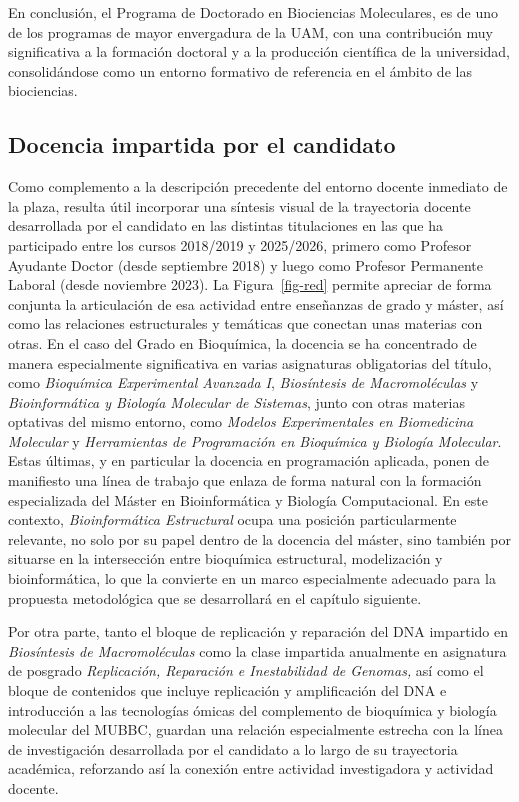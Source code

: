 \documentclass[
  11pt,
  a4paper,
  twoside]{scrreprt}
\begin{document}
En conclusión, el Programa de Doctorado en Biociencias Moleculares, es
de uno de los programas de mayor envergadura de la UAM, con una
contribución muy significativa a la formación doctoral y a la producción
científica de la universidad, consolidándose como un entorno formativo
de referencia en el ámbito de las biociencias.

\subsection{Docencia impartida por el candidato}\label{sec-yo}

Como complemento a la descripción precedente del entorno docente
inmediato de la plaza, resulta útil incorporar una síntesis visual de la
trayectoria docente desarrollada por el candidato en las distintas
titulaciones en las que ha participado entre los cursos 2018/2019 y
2025/2026, primero como Profesor Ayudante Doctor (desde septiembre 2018)
y luego como Profesor Permanente Laboral (desde noviembre 2023). La
Figura~\ref{fig-red} permite apreciar de forma conjunta la articulación
de esa actividad entre enseñanzas de grado y máster, así como las
relaciones estructurales y temáticas que conectan unas materias con
otras. En el caso del Grado en Bioquímica, la docencia se ha concentrado
de manera especialmente significativa en varias asignaturas obligatorias
del título, como \emph{Bioquímica Experimental Avanzada I},
\emph{Biosíntesis de Macromoléculas} y \emph{Bioinformática y Biología
Molecular de Sistemas}, junto con otras materias optativas del mismo
entorno, como \emph{Modelos Experimentales en Biomedicina Molecular} y
\emph{Herramientas de Programación en Bioquímica y Biología Molecular}.
Estas últimas, y en particular la docencia en programación aplicada,
ponen de manifiesto una línea de trabajo que enlaza de forma natural con
la formación especializada del Máster en Bioinformática y Biología
Computacional. En este contexto, \emph{Bioinformática Estructural} ocupa
una posición particularmente relevante, no solo por su papel dentro de
la docencia del máster, sino también por situarse en la intersección
entre bioquímica estructural, modelización y bioinformática, lo que la
convierte en un marco especialmente adecuado para la propuesta
metodológica que se desarrollará en el capítulo siguiente.

Por otra parte, tanto el bloque de replicación y reparación del DNA
impartido en \emph{Biosíntesis de Macromoléculas} como la clase
impartida anualmente en asignatura de posgrado \emph{Replicación,
Reparación e Inestabilidad de Genomas,} así como el bloque de contenidos
que incluye replicación y amplificación del DNA e introducción a las
tecnologías ómicas del complemento de bioquímica y biología molecular
del MUBBC, guardan una relación especialmente estrecha con la línea de
investigación desarrollada por el candidato a lo largo de su trayectoria
académica, reforzando así la conexión entre actividad investigadora y
actividad docente.
\end{document}

